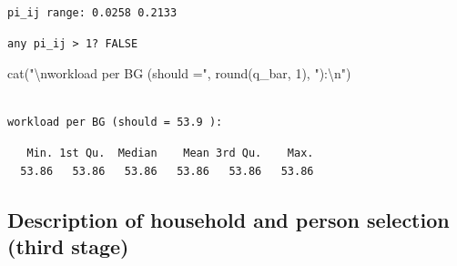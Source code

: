 \documentclass[
  11pt,
]{article}
\newenvironment{Shaded}{\begin{snugshade}}{\end{snugshade}}
\newcommand{\DecValTok}[1]{\textcolor[rgb]{0.68,0.00,0.00}{#1}}
\newcommand{\FunctionTok}[1]{\textcolor[rgb]{0.28,0.35,0.67}{#1}}
\newcommand{\NormalTok}[1]{\textcolor[rgb]{0.00,0.23,0.31}{#1}}
\newcommand{\SpecialCharTok}[1]{\textcolor[rgb]{0.37,0.37,0.37}{#1}}
\newcommand{\StringTok}[1]{\textcolor[rgb]{0.13,0.47,0.30}{#1}}
\begin{document}
\begin{verbatim}
pi_ij range: 0.0258 0.2133 
\end{verbatim}

\begin{Shaded}
\end{Shaded}

\begin{verbatim}
any pi_ij > 1? FALSE 
\end{verbatim}

\begin{Shaded}
\begin{Highlighting}[]
\FunctionTok{cat}\NormalTok{(}\StringTok{"}\SpecialCharTok{\textbackslash{}n}\StringTok{workload per BG (should ="}\NormalTok{, }\FunctionTok{round}\NormalTok{(q\_bar, }\DecValTok{1}\NormalTok{), }\StringTok{"):}\SpecialCharTok{\textbackslash{}n}\StringTok{"}\NormalTok{)}
\end{Highlighting}
\end{Shaded}

\begin{verbatim}

workload per BG (should = 53.9 ):
\end{verbatim}

\begin{Shaded}
\end{Shaded}

\begin{verbatim}
   Min. 1st Qu.  Median    Mean 3rd Qu.    Max. 
  53.86   53.86   53.86   53.86   53.86   53.86 
\end{verbatim}

\subsection{Description of household and person selection (third
stage)}\label{description-of-household-and-person-selection-third-stage}
\end{document}
